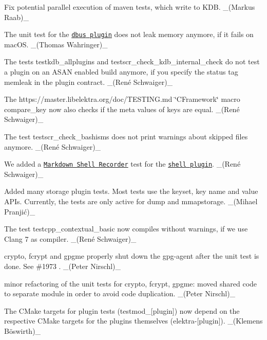 \begin{DoxyItemize}
\item Fix potential parallel execution of maven tests, which write to K\+DB. \+\_\+(\+Markus Raab)\+\_\+
\item The unit test for the \href{https://www.libelektra.org/plugins/dbus}{\tt {\ttfamily dbus} plugin} does not leak memory anymore, if it fails on mac\+OS. \+\_\+(\+Thomas Wahringer)\+\_\+
\item The tests {\ttfamily testkdb\+\_\+allplugins} and {\ttfamily testscr\+\_\+check\+\_\+kdb\+\_\+internal\+\_\+check} do not test a plugin on an A\+S\+AN enabled build anymore, if you specify the status tag {\ttfamily memleak} in the plugin contract. \+\_\+(René Schwaiger)\+\_\+
\item The https\+://master.libelektra.\+org/doc/\+T\+E\+S\+T\+I\+NG.md \char`\"{}\+C\+Framework\char`\"{} macro {\ttfamily compare\+\_\+key} now also checks if the meta values of keys are equal. \+\_\+(René Schwaiger)\+\_\+
\item The test {\ttfamily testscr\+\_\+check\+\_\+bashisms} does not print warnings about skipped files anymore. \+\_\+(René Schwaiger)\+\_\+
\item We added a \href{https://master.libelektra.org/tests/shell/shell_recorder/tutorial_wrapper}{\tt Markdown Shell Recorder} test for the \href{https://www.libelektra.org/plugins/shell}{\tt {\ttfamily shell} plugin}. \+\_\+(René Schwaiger)\+\_\+
\item Added many storage plugin tests. Most tests use the keyset, key name and value A\+P\+Is. Currently, the tests are only active for {\ttfamily dump} and {\ttfamily mmapstorage}. \+\_\+(Mihael Pranjić)\+\_\+
\item The test {\ttfamily testcpp\+\_\+contextual\+\_\+basic} now compiles without warnings, if we use Clang 7 as compiler. \+\_\+(René Schwaiger)\+\_\+
\item crypto, fcrypt and gpgme properly shut down the gpg-\/agent after the unit test is done. See \#1973 . \+\_\+(\+Peter Nirschl)\+\_\+
\item minor refactoring of the unit tests for crypto, fcrypt, gpgme\+: moved shared code to separate module in order to avoid code duplication. \+\_\+(\+Peter Nirschl)\+\_\+
\item The C\+Make targets for plugin tests ({\ttfamily testmod\+\_\+\mbox{[}plugin\mbox{]}}) now depend on the respective C\+Make targets for the plugins themselves ({\ttfamily elektra-\/\mbox{[}plugin\mbox{]}}). \+\_\+(Klemens Böswirth)\+\_\+

\end{DoxyItemize}
